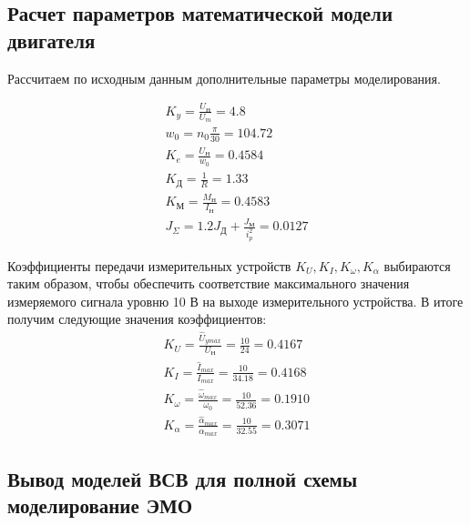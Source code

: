 \documentclass[a4paper, 12pt]{article}
\begin{document}
\newpage

\begin{center}
	\section{Расчет параметров математической модели двигателя}
\end{center}\par
Рассчитаем по исходным данным дополнительные параметры моделирования.\par

\begin{gather}
	K_y  = \frac{U_\text{Н}}{U_m}  = 4.8\\
	w_0  = n_0\frac{\pi}{30} = 104.72 \\
	K_e  = \frac{U_\text{Н}}{w_0} = 0.4584\\
	K_\text{Д}  = \frac{1}{R} = 1.33 \\
	K_\text{М}  = \frac{M_\text{Н}}{I_\text{Н}} =  0.4583\\
	J_{\Sigma}  = 1.2J_\text{Д} + \frac{J_\text{М}}{i^2_p} = 0.0127
\end{gather} \par
Коэффициенты передачи измерительных устройств $K_U, K_I, K_\omega, K_\alpha$ выбираются таким образом, чтобы обеспечить соответствие максимального значения измеряемого сигнала уровню 10 В на выходе измерительного устройства. В итоге получим следующие значения коэффициентов:
\begin{gather}
	K_U = \frac{\hat{U}_{ymax}}{U_\text{Н}} = \frac{10}{24} = 0.4167\\
	K_I = \frac{\hat{I}_{max}}{I_{max}} = \frac{10}{34.18} =  0.4168\\
	K_\omega = \frac{\hat{\omega}_{max}}{\omega_0} = \frac{10}{52.36} = 0.1910\\
	K_\alpha = \frac{\hat{\alpha}_{max}}{\alpha_{max}} = \frac{10}{32.55} = 0.3071
\end{gather}

\newpage

\begin{center}
	\section{Вывод моделей ВСВ для полной схемы моделирование ЭМО}
\end{center} \par
\end{document}
